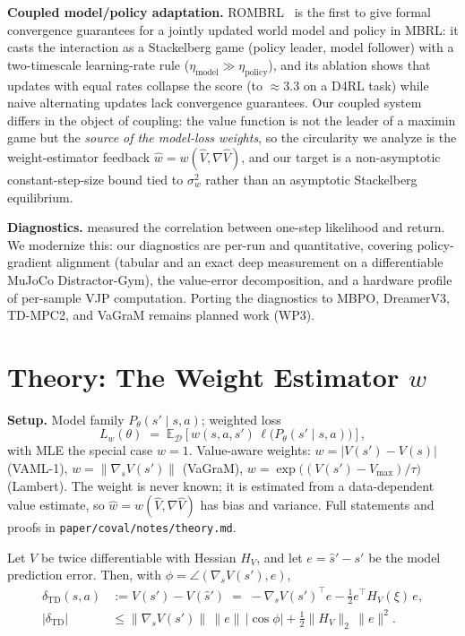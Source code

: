 \documentclass{article}
\theoremstyle{plain}
\begin{document}
\textbf{Coupled model/policy adaptation.} ROMBRL~\citep{chen2026rombri} is the first to
give formal convergence guarantees for a jointly updated world model and policy in MBRL:
it casts the interaction as a Stackelberg game (policy leader, model follower) with a
two-timescale learning-rate rule ($\eta_{\text{model}} \gg \eta_{\text{policy}}$), and its
ablation shows that updates with equal rates collapse the score (to $\approx 3.3$ on a
D4RL task) while naive alternating updates lack convergence guarantees. Our coupled
system differs in the object of coupling: the value function is not the leader of a
maximin game but the \emph{source of the model-loss weights}, so the circularity we
analyze is the weight-estimator feedback $\hat{w} = w(\hat{V}, \nabla \hat{V})$, and our
target is a non-asymptotic constant-step-size bound tied to $\sigma_w^2$ rather than an
asymptotic Stackelberg equilibrium.

\textbf{Diagnostics.} \citet{lambert2020objective} measured the correlation
between one-step likelihood and return. We modernize this: our diagnostics are per-run
and quantitative, covering policy-gradient alignment (tabular and an exact
deep measurement on a differentiable MuJoCo Distractor-Gym), the value-error
decomposition, and a hardware profile of per-sample VJP computation. Porting the
diagnostics to MBPO, DreamerV3, TD-MPC2, and VaGraM remains planned work (WP3).

\section{Theory: The Weight Estimator \texorpdfstring{$w$}{w}}
\label{sec:theory}

\textbf{Setup.} Model family $P_\theta(s' \mid s, a)$; weighted loss
\begin{equation}
  L_w(\theta) \;=\; \mathbb{E}_{\mathcal{D}}\!\left[
    w(s, a, s')\, \ell\bigl(P_\theta(s' \mid s, a)\bigr)
  \right],
  \label{eq:weighted-loss}
\end{equation}
with MLE the special case $w = 1$. Value-aware weights: $w = \lvert V(s') - V(s)\rvert$
(VAML-1), $w = \lVert \nabla_s V(s')\rVert$ (VaGraM),
$w = \exp\bigl((V(s') - V_{\max})/\tau\bigr)$ (Lambert). The weight is never known; it
is estimated from a data-dependent value estimate, so
$\hat{w} = w(\hat{V}, \nabla \hat{V})$ has bias and variance. Full statements and proofs
in \texttt{paper/coval/notes/theory.md}.

\begin{lemma}[decomposition]
\label{lem:decomp}
Let $V$ be twice differentiable with Hessian $H_V$, and let $e = \hat{s}' - s'$ be the
model prediction error. Then, with $\phi = \angle(\nabla_s V(s'), e)$,
\begin{align}
  \delta_{\mathrm{TD}}(s,a) &:= V(s') - V(\hat{s}') 
    \;=\; - \nabla_s V(s')^{\top} e - \tfrac{1}{2} e^{\top} H_V(\xi)\, e, \\
  \lvert \delta_{\mathrm{TD}} \rvert
    &\le \lVert \nabla_s V(s')\rVert\, \lVert e\rVert\, \lvert\cos\phi\rvert
       + \tfrac{1}{2} \lVert H_V \rVert_2\, \lVert e\rVert^2.
\end{align}
\end{lemma}
\end{document}
